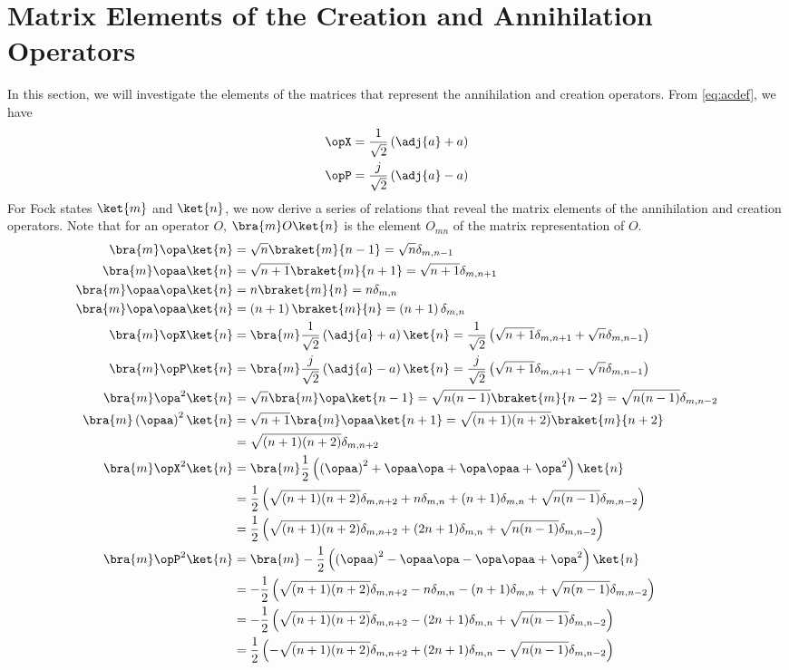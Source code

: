 \section{Matrix Elements of the Creation and Annihilation Operators}
In this section, we will investigate the elements of the matrices that represent the annihilation and creation operators. From \eqref{eq:acdef}, we have
\begin{align}
\opX &= \frac{1}{\sqrt{2}}\left(\adj{a} + a\right)\\
\opP &= \frac{j}{\sqrt{2}}\left(\adj{a} - a\right)
\end{align}
For Fock states $\ket{m}$ and $\ket{n}$, we now derive a series of relations that reveal the matrix elements of the annihilation and creation operators. Note that for an operator $O$, $\bra{m}O\ket{n}$ is the element $O_{mn}$ of the matrix representation of $O$.
\begin{align}
\bra{m}\opa\ket{n} &= \sqrt{n}\braket{m}{n-1} = \sqrt{n}\delta_{m,n-1}\\ 
\bra{m}\opaa\ket{n} &= \sqrt{n+1}\braket{m}{n+1} = \sqrt{n+1}\delta_{m,n+1}\\ 
\bra{m}\opaa\opa\ket{n} &= n\braket{m}{n} = n\delta_{m,n}\\ 
\bra{m}\opa\opaa\ket{n} &= \left(n+1\right)\braket{m}{n} = \left(n+1\right)\delta_{m,n}\\ 
\bra{m}\opX\ket{n} &= \bra{m}\frac{1}{\sqrt{2}}\left(\adj{a} + a\right)\ket{n} = \frac{1}{\sqrt{2}}\left(\sqrt{n+1}\delta_{m,n+1} + \sqrt{n}\delta_{m,n-1}\right)\\ 
\bra{m}\opP\ket{n} &= \bra{m}\frac{j}{\sqrt{2}}\left(\adj{a} - a\right)\ket{n} = \frac{j}{\sqrt{2}}\left(\sqrt{n+1}\delta_{m,n+1} - \sqrt{n}\delta_{m,n-1}\right)\\ 
\bra{m}\opa^2\ket{n} &= \sqrt{n}\bra{m}\opa\ket{n-1} = \sqrt{n(n-1)}\braket{m}{n-2} = \sqrt{n(n-1)}\delta_{m,n-2}\\ 
\bra{m}\left(\opaa\right)^2\ket{n} &= \sqrt{n+1}\bra{m}\opaa\ket{n+1} = \sqrt{(n+1)(n+2)}\braket{m}{n+2}\\
&= \sqrt{(n+1)(n+2)}\delta_{m,n+2}\\
\bra{m}\opX^2\ket{n} &= \bra{m}\frac{1}{2}\left(\left(\opaa\right)^2 + \opaa\opa + \opa\opaa + \opa^2\right)\ket{n}\\
&= \frac{1}{2}\left(\sqrt{(n+1)(n+2)}\delta_{m,n+2} + n\delta_{m,n} + (n+1)\delta_{m,n} + \sqrt{n(n-1)}\delta_{m,n-2}\right)\\
&= \frac{1}{2}\left(\sqrt{(n+1)(n+2)}\delta_{m,n+2} + (2n+1)\delta_{m,n} + \sqrt{n(n-1)}\delta_{m,n-2}\right)\\
\bra{m}\opP^2\ket{n} &= \bra{m}-\frac{1}{2}\left(\left(\opaa\right)^2 - \opaa\opa - \opa\opaa + \opa^2\right)\ket{n}\\
&= -\frac{1}{2}\left(\sqrt{(n+1)(n+2)}\delta_{m,n+2} - n\delta_{m,n} - (n+1)\delta_{m,n} + \sqrt{n(n-1)}\delta_{m,n-2}\right)\\
&= -\frac{1}{2}\left(\sqrt{(n+1)(n+2)}\delta_{m,n+2} - (2n+1)\delta_{m,n} + \sqrt{n(n-1)}\delta_{m,n-2}\right)\\
&= \frac{1}{2}\left(-\sqrt{(n+1)(n+2)}\delta_{m,n+2} + (2n+1)\delta_{m,n} - \sqrt{n(n-1)}\delta_{m,n-2}\right)\\
\end{align}
